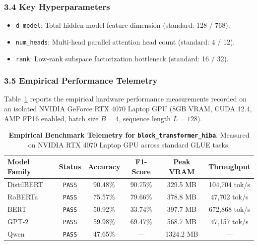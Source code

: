 \subsubsection*{3.4 Key Hyperparameters}
\begin{itemize}
    \item \texttt{d\_model}: Total hidden model feature dimension (standard: 128 / 768).
    \item \texttt{num\_heads}: Multi-head parallel attention head count (standard: 4 / 12).
    \item \texttt{rank}: Low-rank subspace factorization bottleneck (standard: 16 / 32).
\end{itemize}

\subsubsection*{3.5 Empirical Performance Telemetry}
Table~\ref{tab:telemetry_block_transformer_hiba} reports the empirical hardware performance measurements recorded on an isolated NVIDIA GeForce RTX 4070 Laptop GPU (8GB VRAM, CUDA 12.4, AMP FP16 enabled, batch size $B=4$, sequence length $L=128$).

\begin{table}[h]
\centering
\small
\caption{\textbf{Empirical Benchmark Telemetry for \texttt{block\_transformer\_hiba}}. Measured on NVIDIA RTX 4070 Laptop GPU across standard GLUE tasks.}
\label{tab:telemetry_block_transformer_hiba}
\begin{tabular*}{\columnwidth}{@{\extracolsep{\fill}}lccccc}
\toprule
\textbf{Model Family} & \textbf{Status} & \textbf{Accuracy} & \textbf{F1-Score} & \textbf{Peak VRAM} & \textbf{Throughput} \\
\midrule
DistilBERT & \texttt{PASS} & 90.48\% & 90.75\% & 329.5 MB & 104,704 tok/s \\
RoBERTa & \texttt{PASS} & 75.57\% & 79.66\% & 378.8 MB & 47,702 tok/s \\
BERT & \texttt{PASS} & 50.92\% & 33.74\% & 397.7 MB & 672,868 tok/s \\
GPT-2 & \texttt{PASS} & 59.98\% & 69.47\% & 568.7 MB & 47,157 tok/s \\
Qwen & \texttt{PASS} & 47.65\% & --- & 1324.2 MB & --- \\
\bottomrule
\end{tabular*}
\end{table}

